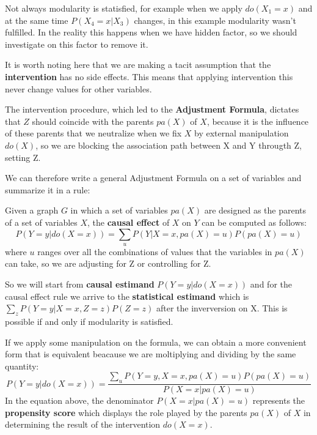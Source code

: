 Not always modularity is statisfied, for example when we apply $do(X_1=x)$
and at the same time $P(X_4=x|X_3)$ changes, in this example modularity wasn't
fulfilled. In the reality this happens when we have hidden factor, so we
should investigate on this factor to remove it.

\begin{note}
      It is worth noting here that we are making a tacit assumption that
      the \textbf{intervention} has no side effects. This means that applying intervention
      this never change values for other variables.
\end{note}

The intervention procedure, which led to the \textbf{Adjustment Formula},
dictates that $Z$ should coincide with the parents $pa(X)$ of $X$, because it is
the influence of these parents that we neutralize when we fix $X$ by external
manipulation $do(X)$, so we are blocking the association path between X and Y througth
Z, setting Z.

We can therefore write a general Adjustment Formula on a set of variables and summarize it in a rule:
\begin{definition}
      Given a graph $G$ in which a set of variables $pa(X)$ are designed as the
      parents of a set of variables $X$, the \textbf{causal effect} of $X$ on $Y$ can be computed
      as follows:
      \begin{equation}
            P(Y = y| do(X = x)) = \sum_{u} P(Y | X = x, pa(X) = u)P(pa(X) = u)
      \end{equation}
      where $u$ ranges over all the combinations of values that the variables in
      $pa(X)$ can take, so we are adjusting for Z or controlling for Z.
\end{definition}

So we will start from \textbf{causal estimand} $P(Y=y|do(X=x))$ and for the causal effect
rule we arrive to the \textbf{statistical estimand} which is  $\sum_z P(Y=y|X=x, Z=z) P(Z=z)$ after
the inverversion on X. This is possible if and only if modularity is satisfied.

If we apply some manipulation on the formula, we can obtain a more convenient
form that is equivalent beacause we are moltiplying and dividing by the same quantity:
\begin{equation}
      P(Y = y| do(X = x)) = \frac{\sum_{u} P(Y = y, X = x, pa(X) = u)P(pa(X) = u)}{P(X = x | pa(X) = u)}
\end{equation}
In the equation above, the denominator $P(X = x | pa(X) = u)$ represents the \textbf{propensity score}
which displays the role played by the parents $pa(X)$ of $X$ in determining the
result of the intervention $do(X = x)$.

